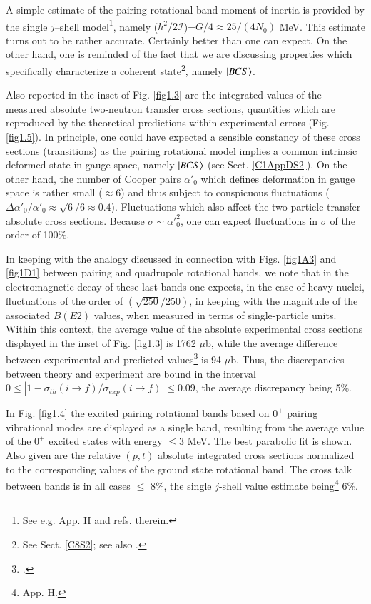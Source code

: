   A simple estimate of the pairing rotational band moment of inertia is provided by the single $j$--shell model\footnote{See e.g. \cite{Brink:05} App. H and refs. therein.}, namely ($\hbar^2/2\mathcal I$)=$G/4\approx25/(4N_0)$ MeV. This estimate turns out to be rather accurate. Certainly better than one can expect. On the other hand, one is reminded of the fact that we are discussing properties which specifically characterize a coherent state\footnote{See  Sect. \ref{C8S2}; see also \cite{Potel:17}.}, namely $|{BCS} \rangle$.
  
  

  Also reported in the inset of Fig. \ref{fig1.3} are the integrated values of the measured absolute two-neutron transfer cross sections, quantities which are reproduced by the theoretical predictions within experimental errors (Fig. \ref{fig1.5}). In principle, one could have expected a sensible constancy of these cross sections (transitions) as the pairing rotational model implies a common intrinsic deformed state in gauge space, namely $|{BCS} \rangle$ (see Sect. \ref{C1AppDS2}). On the other hand, the number of Cooper pairs $\alpha'_0$ which defines deformation in gauge space is rather small ($\approx6$) and thus subject to conspicuous fluctuations  ($\Delta\alpha'_0/\alpha'_0\approx\sqrt{6}/6\approx 0.4$).  Fluctuations which also affect the  two particle transfer absolute cross sections. Because $\sigma\sim\alpha'^{2}_0$, one can expect fluctuations in $\sigma$ of the order of 100\%.  
  
  In keeping with the analogy discussed in connection with Figs. \ref{fig1A3} and \ref{fig1D1} between pairing and quadrupole rotational bands, we note that in the electromagnetic decay of these last bands one expects, in the case of heavy nuclei, fluctuations of the order of $(\sqrt{250}/250)$, in keeping with the magnitude of the associated $B(E2)$ values, when measured in terms of single-particle units. Within this context, the average value of the absolute experimental cross sections displayed in the inset of Fig. \ref{fig1.3} is 1762 $\mu$b, while the average difference between experimental and predicted values\footnote{\cite{Potel:13b}.} is 94 $\mu$b. Thus, the discrepancies between theory and experiment are bound in the interval $0\leq|1-\sigma_{th}(i\to f)/\sigma_{exp}(i\to f)|\leq 0.09$, the average discrepancy being 5\%.
  
  
  In Fig. \ref{fig1.4} the excited pairing rotational bands based on $0^+$ pairing vibrational modes are displayed as a single band, resulting from the average  value of the $0^+$ excited states with energy $\leq$3 MeV. The best parabolic fit is shown. Also given are the relative $(p,t)$ absolute integrated cross sections normalized to the corresponding values of the ground state rotational band. The cross talk between bands is in all cases $\leq$ 8\%, the single $j$-shell value estimate being\footnote{\cite{Brink:05} App. H.} 6\%.
  
